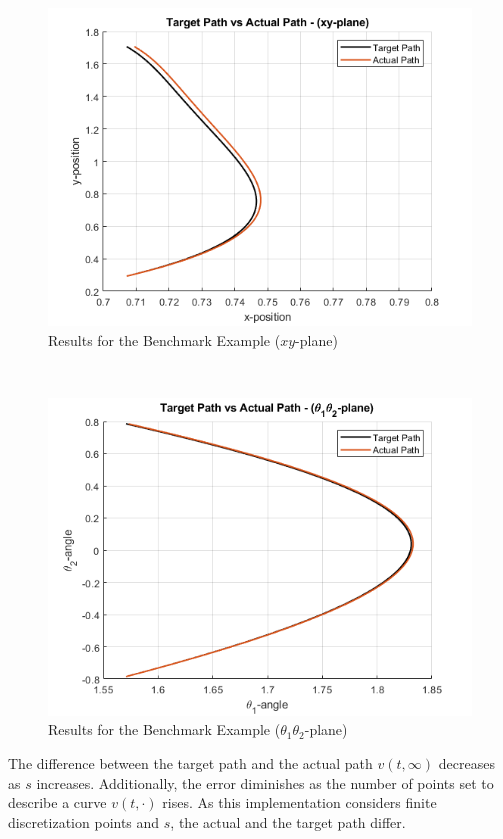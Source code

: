 \documentclass[letterpaper, 10 pt, conference]{ieeeconf}
\begin{document}
{\centering
\begin{figure}[htbp]
\captionsetup{justification=centering}
\centerline{\includegraphics[scale=.475]{results_1_1.png}}
\caption{Results for the Benchmark Example ($xy$-plane)}
\label{fig}
\end{figure}
\\
\begin{figure}[htbp]
\captionsetup{justification=centering}
\centerline{\includegraphics[scale=.475]{results_1_2.png}}
\caption{Results for the Benchmark Example ($\theta_{1}\theta_{2}$-plane)}
\label{fig}
\end{figure}
}

The difference between the target path and the actual path $v(t, \infty)$ decreases as $s$ increases. Additionally, the error diminishes as the number of points set to describe a curve $v(t, \cdot)$ rises. As this implementation considers finite discretization points and $s$, the actual and the target path differ. 
\end{document}
